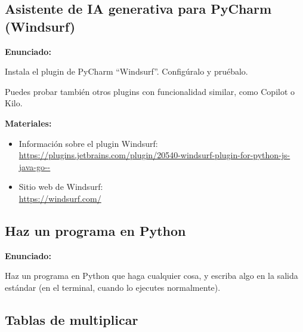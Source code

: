\subsection{Asistente de IA generativa para PyCharm (Windsurf)}
\label{subsec:practicas-pycharm-ia}

\textbf{Enunciado:}

Instala el plugin de PyCharm ``Windsurf''. Configúralo y pruébalo.

Puedes probar también otros plugins con funcionalidad similar, como Copilot o Kilo.

\textbf{Materiales:}

\begin{itemize}
\item Información sobre el plugin Windsurf: \\
  \url{https://plugins.jetbrains.com/plugin/20540-windsurf-plugin-for-python-js-java-go--}
\item Sitio web de Windsurf: \\
  \url{https://windsurf.com/}
\end{itemize}


\subsection{Haz un programa en Python}
\label{subsec:eje-python-primer-programa}

\textbf{Enunciado:}

Haz un programa en Python que haga cualquier cosa, y escriba algo en la salida estándar (en el terminal, cuando lo ejecutes normalmente).


\subsection{Tablas de multiplicar}
\label{subsec:eje-python-tablas}

